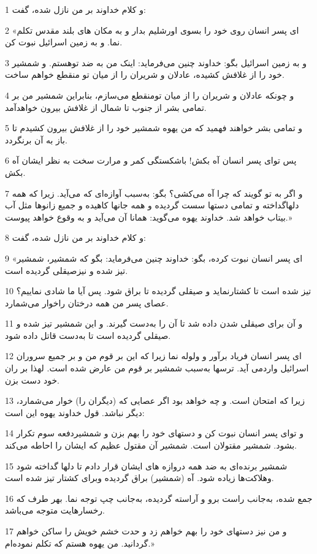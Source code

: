 \par 1 و کلام خداوند بر من نازل شده، گفت:
\par 2 «ای پسر انسان روی خود را بسوی اورشلیم بدار و به مکان های بلند مقدس تکلم نما. و به زمین اسرائیل نبوت کن.
\par 3 و به زمین اسرائیل بگو: خداوند چنین می‌فرماید: اینک من به ضد توهستم. و شمشیر خود را از غلافش کشیده، عادلان و شریران را از میان تو منقطع خواهم ساخت.
\par 4 و چونکه عادلان و شریران را از میان تومنقطع می‌سازم، بنابراین شمشیر من بر تمامی بشر از جنوب تا شمال از غلافش بیرون خواهدآمد.
\par 5 و تمامی بشر خواهند فهمید که من یهوه شمشیر خود را از غلافش بیرون کشیدم تا باز به آن برنگردد.
\par 6 پس تو‌ای پسر انسان آه بکش! باشکستگی کمر و مرارت سخت به نظر ایشان آه بکش.
\par 7 و اگر به تو گویند که چرا آه می‌کشی؟ بگو: به‌سبب آوازه‌ای که می‌آید. زیرا که همه دلهاگداخته و تمامی دستها سست گردیده و همه جانها کاهیده و جمیع زانوها مثل آب بیتاب خواهد شد. خداوند یهوه می‌گوید: همانا آن می‌آید و به وقوع خواهد پیوست.»
\par 8 و کلام خداوند بر من نازل شده، گفت:
\par 9 «ای پسر انسان نبوت کرده، بگو: خداوند چنین می‌فرماید: بگو که شمشیر، شمشیر تیز شده و نیزصیقلی گردیده است.
\par 10 تیز شده است تا کشتارنماید و صیقلی گردیده تا براق شود. پس آیا ما شادی نماییم؟ عصای پسر من همه درختان راخوار می‌شمارد.
\par 11 و آن برای صیقلی شدن داده شد تا آن را به‌دست گیرند. و این شمشیر تیز شده و صیقلی گردیده است تا به‌دست قاتل داده شود.
\par 12 ‌ای پسر انسان فریاد برآور و ولوله نما زیرا که این بر قوم من و بر جمیع سروران اسرائیل واردمی آید. ترسها به‌سبب شمشیر بر قوم من عارض شده است. لهذا بر ران خود دست بزن.
\par 13 زیرا که امتحان است. و چه خواهد بود اگر عصایی که (دیگران را) خوار می‌شمارد، دیگر نباشد. قول خداوند یهوه این است:
\par 14 و تو‌ای پسر انسان نبوت کن و دستهای خود را بهم بزن و شمشیردفعه سوم تکرار بشود. شمشیر مقتولان است. شمشیر آن مقتول عظیم که ایشان را احاطه می‌کند.
\par 15 شمشیر برنده‌ای به ضد همه دروازه های ایشان قرار دادم تا دلها گداخته شود وهلاکت‌ها زیاده شود. آه (شمشیر) براق گردیده وبرای کشتار تیز شده است.
\par 16 جمع شده، به‌جانب راست برو و آراسته گردیده، به‌جانب چپ توجه نما. بهر طرف که رخسارهایت متوجه می‌باشد.
\par 17 و من نیز دستهای خود را بهم خواهم زد و حدت خشم خویش را ساکن خواهم گردانید. من یهوه هستم که تکلم نموده‌ام.»
